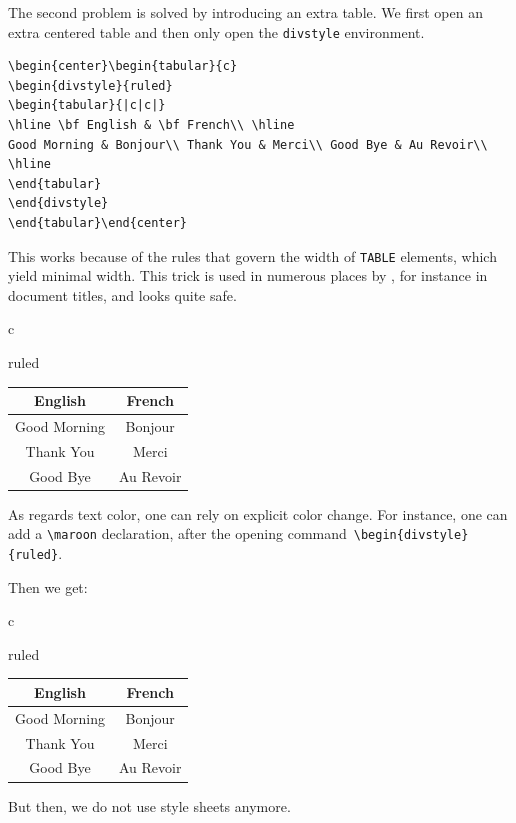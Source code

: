 The second problem is solved by introducing an extra table.
We first open an extra centered table and then only open the
\texttt{divstyle} environment.
\begin{verbatim}
\begin{center}\begin{tabular}{c}
\begin{divstyle}{ruled}
\begin{tabular}{|c|c|}
\hline \bf English & \bf French\\ \hline
Good Morning & Bonjour\\ Thank You & Merci\\ Good Bye & Au Revoir\\
\hline
\end{tabular}
\end{divstyle}
\end{tabular}\end{center}
\end{verbatim}
This works because of the rules that
govern the width of {\html} \verb+TABLE+ elements, which yield
minimal width. This trick is used in
numerous places by \hevea{}, for instance in document titles, and looks
quite safe.
\begin{htmlonly}
\begin{center}\begin{tabular}{c}
\begin{divstyle}{ruled}
\begin{tabular}{|c|c|}
\hline \bf English & \bf French\\ \hline
Good Morning & Bonjour\\ Thank You & Merci\\ Good Bye & Au Revoir\\
\hline
\end{tabular}
\end{divstyle}
\end{tabular}\end{center}
\end{htmlonly}
As regards text color, one can rely on explicit color change.
For instance, one can add a \verb+\maroon+ declaration, after the
opening command~\verb+\begin{divstyle}{ruled}+.
\begin{htmlonly}
Then we get:
\begin{center}\begin{tabular}{c}
\begin{divstyle}{ruled}\maroon
\begin{tabular}{|c|c|}
\hline \bf English & \bf French\\ \hline
Good Morning & Bonjour\\ Thank You & Merci\\ Good Bye & Au Revoir\\
\hline
\end{tabular}
\end{divstyle}
\end{tabular}\end{center}
\end{htmlonly}
But then, we do not use style sheets anymore.

